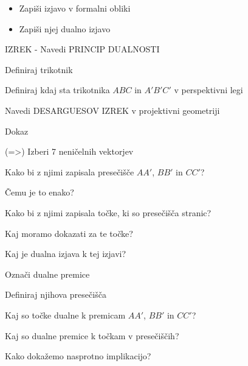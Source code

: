 \documentclass{article}
\begin{document}
\begin{enumerate}
        \begin{itemize}
            \item Zapiši izjavo v formalni obliki
            \item Zapiši njej dualno izjavo
        \end{itemize}
        \item IZREK - Navedi PRINCIP DUALNOSTI
        \item Definiraj trikotnik
        \item Definiraj kdaj sta trikotnika $ABC$ in $A'B'C'$ v perspektivni legi
        {\color{red}\item Navedi DESARGUESOV IZREK v projektivni geometriji}
        \item Dokaz
        \begin{itemize}
            \item (=>) Izberi 7 neničelnih vektorjev
            \item Kako bi z njimi zapisala presečišče $AA'$, $BB'$ in $CC'$?
            {\color{red}\item Čemu je to enako?}
            {\color{red}\item Kako bi z njimi zapisala točke, ki so presečišča stranic?}
            \item Kaj moramo dokazati za te točke?
            \item Kaj je dualna izjava k tej izjavi?
            \item Označi dualne premice
            {\color{red}\item Definiraj njihova presečišča}
            \item Kaj so točke dualne k premicam $AA'$, $BB'$ in $CC'$?
            {\color{red}\item Kaj so dualne premice k točkam v presečiščih?}
            \item Kako dokažemo nasprotno implikacijo? 
        \end{itemize} 
    \end{enumerate}
\end{document}
